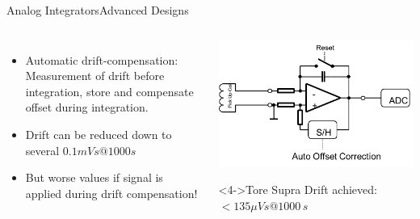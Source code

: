 \documentclass{beamer}
\begin{document}
\begin{frame}{Analog Integrators}{Advanced Designs}
\begin{columns}
	\begin{itemize}
		\item Automatic drift-compensation: Measurement of drift before integration, store and compensate offset during integration.
		\item<2-> Drift can be reduced down to  several $0.1mVs @ 1000s$
		\item<3->  But worse values if signal  is applied during drift  compensation!
	\end{itemize}
	\begin{center}
	\includegraphics[width=0.8\columnwidth]{toreSupreInt.png}
	\begin{block}<4->{Tore Supra}
	Drift achieved: $ < 135 \mu Vs @ 1000\,  s$

	\end{block}
	\end{center}
\end{columns}
\end{frame}

\end{document}
